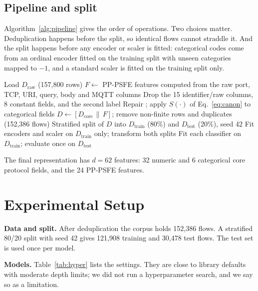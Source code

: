 \documentclass[journal]{IEEEtran}
\newcommand{\feat}[1]{\texttt{\detokenize{#1}}}
\begin{document}
\subsection{Pipeline and split}
Algorithm~\ref{alg:pipeline} gives the order of operations. Two choices matter. Deduplication happens before the split, so identical flows cannot straddle it. And the split happens before any encoder or scaler is fitted: categorical codes come from an ordinal encoder fitted on the training split with unseen categories mapped to $-1$, and a standard scaler is fitted on the training split only.

\begin{algorithm}[!t]
\caption{Leakage-controlled preprocessing and PP-PSFE}
\label{alg:pipeline}
\begin{algorithmic}[1]
\State Load $D_{\text{raw}}$ (157,800 rows)
\State $F \gets$ PP-PSFE features computed from the raw port, TCP, URI, query, body and MQTT columns
\State Drop the 15 identifier/raw columns, 8 constant fields, and the second label
\State Repair \feat{dns.qry.name.len}; apply $S(\cdot)$ of Eq.~\eqref{eq:canon} to categorical fields
\State $D \gets [D_{\text{core}} \,\|\, F]$; remove non-finite rows and duplicates (152,386 flows)
\State Stratified split of $D$ into $D_{\text{train}}$ (80\%) and $D_{\text{test}}$ (20\%), seed 42
\State Fit encoders and scaler on $D_{\text{train}}$ only; transform both splits
\State Fit each classifier on $D_{\text{train}}$; evaluate once on $D_{\text{test}}$
\end{algorithmic}
\end{algorithm}

The final representation has $d=62$ features: 32 numeric and 6 categorical core protocol fields, and the 24 PP-PSFE features.

\section{Experimental Setup}\label{sec:setup}
\textbf{Data and split.} After deduplication the corpus holds 152,386 flows. A stratified 80/20 split with seed 42 gives 121,908 training and 30,478 test flows. The test set is used once per model.

\textbf{Models.} Table~\ref{tab:hyper} lists the settings. They are close to library defaults with moderate depth limits; we did not run a hyperparameter search, and we say so as a limitation.
\end{document}
